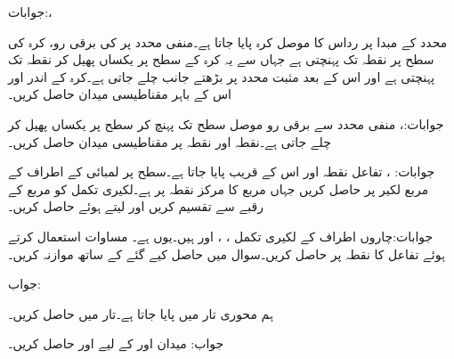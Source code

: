 جوابات:، 

محدد کے مبدا پر رداس  کا موصل کرہ پایا جاتا ہے۔منفی  محدد پر  کی برقی رو، کرہ کی سطح پر نقطہ  تک پہنچتی ہے جہاں سے یہ کرہ کے سطح پر یکساں پھیل کر نقطہ  تک پہنچتی ہے اور اس کے بعد مثبت  محدد پر بڑھتے جانب چلے جاتی ہے۔کرہ کے اندر اور اس کے باہر مقناطیسی میدان حاصل کریں۔

جوابات:،    
منفی  محدد سے برقی رو  موصل   سطح تک پہنچ کر سطح پر یکساں پھیل کر چلے جاتی ہے۔نقطہ  اور نقطہ  پر مقناطیسی میدان  حاصل کریں۔

جوابات: ، 
تفاعل  نقطہ  اور اس کے قریب پایا جاتا ہے۔سطح  پر  لمبائی کے اطراف کے مربع لکیر پر  حاصل کریں جہاں مربع کا مرکز نقطہ  پر ہے۔لکیری تکمل کو مربع کے رقبے سے تقسیم کریں اور  لیتے ہوئے  حاصل کریں۔

جوابات:چاروں اطراف کے لکیری تکمل ، ،   اور  ہیں۔یوں  ہے۔
مساوات  استعمال کرتے ہوئے تفاعل  کا نقطہ  پر  حاصل کریں۔سوال  میں حاصل کیے گئے  کے ساتھ موازنہ کریں۔

جواب: 

ہم محوری تار میں  پایا جاتا ہے۔تار میں  حاصل کریں۔

جواب:
میدان  اور  کے لیے  اور  حاصل کریں۔

